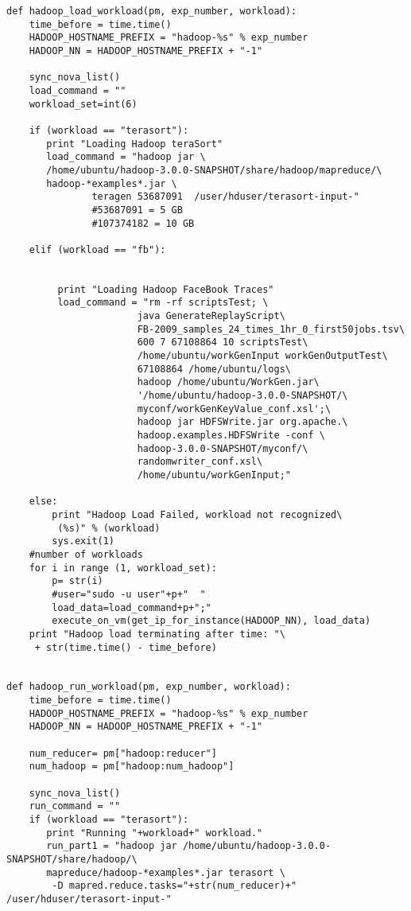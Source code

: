 \begin{verbatim}
def hadoop_load_workload(pm, exp_number, workload):
    time_before = time.time()
    HADOOP_HOSTNAME_PREFIX = "hadoop-%s" % exp_number
    HADOOP_NN = HADOOP_HOSTNAME_PREFIX + "-1"

    sync_nova_list()
    load_command = ""
    workload_set=int(6)

    if (workload == "terasort"):
       print "Loading Hadoop teraSort"
       load_command = "hadoop jar \
       /home/ubuntu/hadoop-3.0.0-SNAPSHOT/share/hadoop/mapreduce/\
       hadoop-*examples*.jar \
               teragen 53687091  /user/hduser/terasort-input-"
               #53687091 = 5 GB
               #107374182 = 10 GB
   
    elif (workload == "fb"):

       
         print "Loading Hadoop FaceBook Traces"
         load_command = "rm -rf scriptsTest; \
                       java GenerateReplayScript\
                       FB-2009_samples_24_times_1hr_0_first50jobs.tsv\
                       600 7 67108864 10 scriptsTest\
                       /home/ubuntu/workGenInput workGenOutputTest\
                       67108864 /home/ubuntu/logs\
                       hadoop /home/ubuntu/WorkGen.jar\
                       '/home/ubuntu/hadoop-3.0.0-SNAPSHOT/\
                       myconf/workGenKeyValue_conf.xsl';\
                       hadoop jar HDFSWrite.jar org.apache.\
                       hadoop.examples.HDFSWrite -conf \
                       hadoop-3.0.0-SNAPSHOT/myconf/\
                       randomwriter_conf.xsl\
                       /home/ubuntu/workGenInput;"                          

    else: 
        print "Hadoop Load Failed, workload not recognized\
         (%s)" % (workload)
        sys.exit(1)
    #number of workloads    
    for i in range (1, workload_set):
        p= str(i)
        #user="sudo -u user"+p+"  "
        load_data=load_command+p+";" 
        execute_on_vm(get_ip_for_instance(HADOOP_NN), load_data)
    print "Hadoop load terminating after time: "\
     + str(time.time() - time_before)


def hadoop_run_workload(pm, exp_number, workload):
    time_before = time.time()
    HADOOP_HOSTNAME_PREFIX = "hadoop-%s" % exp_number
    HADOOP_NN = HADOOP_HOSTNAME_PREFIX + "-1"
    
    num_reducer= pm["hadoop:reducer"]
    num_hadoop = pm["hadoop:num_hadoop"]

    sync_nova_list()
    run_command = ""
    if (workload == "terasort"): 
       print "Running "+workload+" workload."
       run_part1 = "hadoop jar /home/ubuntu/hadoop-3.0.0-SNAPSHOT/share/hadoop/\
       mapreduce/hadoop-*examples*.jar terasort \
        -D mapred.reduce.tasks="+str(num_reducer)+"  /user/hduser/terasort-input-"
   

\end{verbatim}
